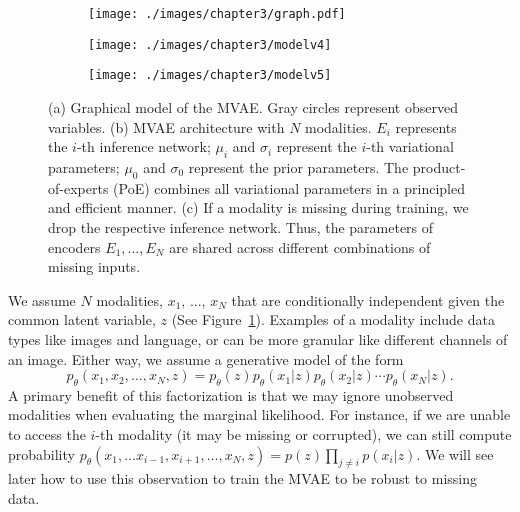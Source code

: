 \begin{figure}[h!]
\centering
    \begin{subfigure}[b]{.2\linewidth}
        \centering
        \texttt{[image: ./images/chapter3/graph.pdf]}
        \caption{}
        \label{fig:diagram:graph}
    \end{subfigure}\hspace{5mm}
    \begin{subfigure}[b]{.2\linewidth}
        \texttt{[image: ./images/chapter3/modelv4]}
        \caption{}
        \label{fig:diagram:modelv2}
    \end{subfigure}\hspace{5mm}
    \begin{subfigure}[b]{.23\linewidth}
        \texttt{[image: ./images/chapter3/modelv5]}
        \caption{}
        \label{fig:diagram:modelv3}
    \end{subfigure}\hspace{5mm}
    \caption{(a) Graphical model of the MVAE. Gray circles represent observed variables. (b) MVAE architecture with $N$ modalities. $E_{i}$ represents the $i$-th inference network; $\mu_{i}$ and $\sigma_{i}$ represent the $i$-th variational parameters; $\mu_{0}$ and $\sigma_{0}$ represent the prior  parameters. The product-of-experts (PoE) combines all variational parameters in a principled and efficient manner. (c) If a modality is missing during training, we drop the respective inference network. Thus, the parameters of encoders $E_{1}, ..., E_{N}$ are shared across different combinations of missing inputs.}
    \label{fig:diagram}
\end{figure}

We assume $N$ modalities, $x_{1}$, ..., $x_{N}$ that are conditionally independent given the common latent variable, $z$ (See Figure~\ref{fig:diagram:graph}). Examples of a modality include data types like images and language, or can be more granular like different channels of an image. 
Either way, we assume a generative model of the form 
\begin{equation}
p_{\theta}(x_{1}, x_{2}, ..., x_{N}, z) = p_{\theta}(z)p_{\theta}(x_{1}|z)p_{\theta}(x_{2}|z)\cdots p_{\theta}(x_{N}|z).
\end{equation}
A primary benefit of this factorization is that we may ignore unobserved modalities when evaluating the marginal likelihood. For instance, if we are unable to access the $i$-th modality (it may be missing or corrupted), we can still compute probability $p_\theta(x_1, \ldots x_{i-1}, x_{i+1}, \ldots, x_N, z) = p(z)\prod_{j\neq i} p(x_i | z)$. We will see later how to use this observation to train the MVAE to be robust to missing data.


